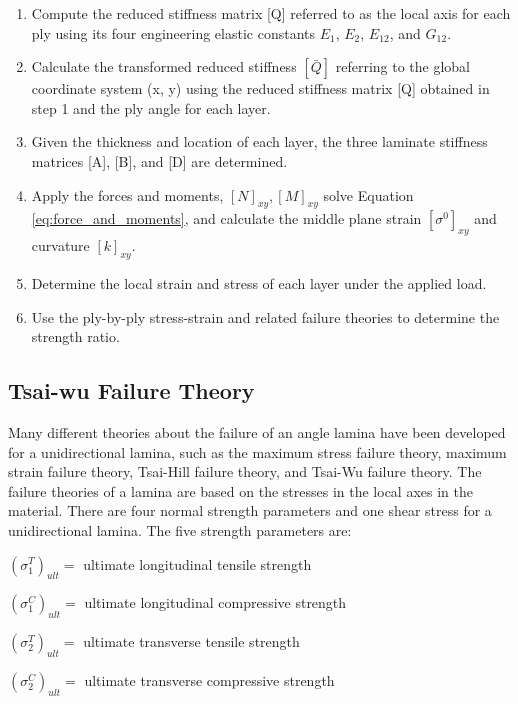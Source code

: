 \begin{enumerate}
\item Compute the reduced stiffness matrix [Q] referred to as the local axis for each ply using its four engineering elastic constants $E_1 $, $E_2 $, $E_{12} $, and $G_{12} $.

\item Calculate the transformed reduced stiffness $[\bar{Q}] $ referring to the global coordinate system (x, y) using the reduced stiffness matrix [Q] obtained in step 1 and the ply angle for each layer.

\item  Given the thickness and location of each layer, the three laminate stiffness matrices [A], [B], and [D] are determined.

\item  Apply the forces and moments, $[N]_{xy}, [M]_{xy} $ solve
Equation \ref{eq:force_and_moments}, and calculate the middle plane strain $[\sigma ^{0}]_{xy} $ and curvature $[k]_{xy} $.

\item Determine the local strain and stress of each layer under the applied load.

\item  Use the ply-by-ply stress-strain and related failure theories to determine the strength ratio.
\end{enumerate}

\subsection{Tsai-wu Failure Theory}

Many different theories about the failure of an angle lamina have been developed for a
unidirectional lamina, such as the maximum stress failure theory, maximum strain failure theory,
Tsai-Hill failure theory, and Tsai-Wu failure theory. The failure theories of a lamina are based on
the stresses in the local axes in the material. There are four normal strength parameters and one shear
stress for a unidirectional lamina. The five strength parameters are:

$(\sigma _1^{T})_{ult}= $ ultimate longitudinal tensile strength

$(\sigma _1^{C})_{ult}= $ ultimate longitudinal compressive strength

$(\sigma _2^{T})_{ult}= $ ultimate transverse tensile strength

$(\sigma _2^{C})_{ult}= $ ultimate transverse compressive strength 

